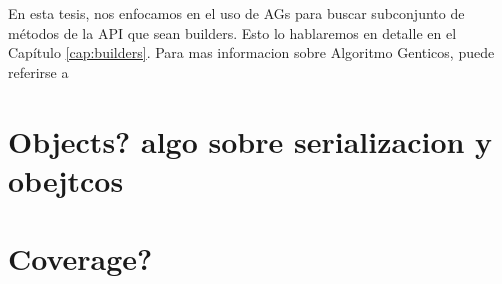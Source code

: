 En esta tesis, nos enfocamos en el uso de AGs para buscar subconjunto de métodos de la API que sean builders. Esto lo hablaremos en detalle en el Capítulo \ref{cap:builders}. Para mas informacion sobre Algoritmo Genticos, puede referirse a \cite{dejong2006evolutionary} 


\section{Objects? algo sobre serializacion y obejtcos}
\section{Coverage?}

